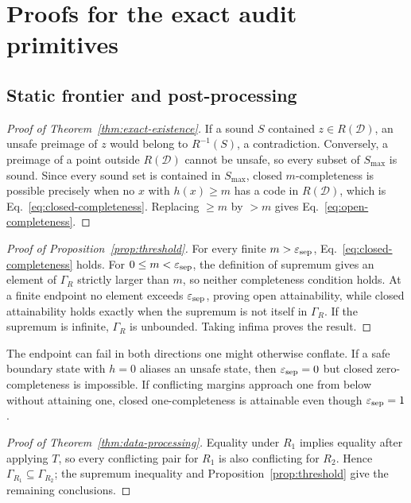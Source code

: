 \section{Proofs for the exact audit primitives}
\label{sec:static-proofs}

\subsection{Static frontier and post-processing}

\begin{proof}[Proof of Theorem~\ref{thm:exact-existence}]
If a sound $S$ contained $z\in R(\mathcal D)$, an unsafe preimage of $z$ would belong to
$R^{-1}(S)$, a contradiction.  Conversely, a preimage of a point outside $R(\mathcal D)$ cannot be
unsafe, so every subset of $S_{\max}$ is sound.  Since every sound set is contained in
$S_{\max}$, closed $m$-completeness is possible precisely when no $x$ with $h(x)\geq m$ has a code
in $R(\mathcal D)$, which is Eq.~\eqref{eq:closed-completeness}.  Replacing $\geq m$ by $>m$
gives Eq.~\eqref{eq:open-completeness}.
\end{proof}

\begin{proof}[Proof of Proposition~\ref{prop:threshold}]
For every finite $m>\varepsilon_{\mathrm{sep}}$, Eq.~\eqref{eq:closed-completeness} holds.  For
$0\leq m<\varepsilon_{\mathrm{sep}}$, the definition of supremum gives an element of $\Gamma_R$ strictly larger than
$m$, so neither completeness condition holds.  At a finite endpoint no element exceeds
$\varepsilon_{\mathrm{sep}}$, proving open attainability, while closed attainability holds exactly when the supremum
is not itself in $\Gamma_R$.  If the supremum is infinite, $\Gamma_R$ is unbounded.  Taking
infima proves the result.
\end{proof}

The endpoint can fail in both directions one might otherwise conflate.  If a safe boundary state
with $h=0$ aliases an unsafe state, then $\varepsilon_{\mathrm{sep}}=0$ but closed zero-completeness is impossible.  If
conflicting margins approach one from below without attaining one, closed one-completeness is
attainable even though $\varepsilon_{\mathrm{sep}}=1$.

\begin{proof}[Proof of Theorem~\ref{thm:data-processing}]
Equality under $R_1$ implies equality after applying $T$, so every conflicting pair for $R_1$ is
also conflicting for $R_2$.  Hence $\Gamma_{R_1}\subseteq\Gamma_{R_2}$; the supremum inequality
and Proposition~\ref{prop:threshold} give the remaining conclusions.
\end{proof}

